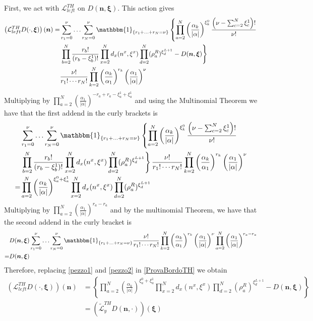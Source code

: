 \documentclass[10pt]{article}
\numberwithin{equation}{section}
\numberwithin{equation}{subsection}
\begin{document}
First, we act with $\mathcal{L}_{left}^{TH}$ on $D(\bm{n},\bm{\xi})$. This action gives
\begin{align}\label{ProvaBordoTH}
	\left(\mathcal{L}_{left}^{TH}D(\cdot,\bm{\xi})\right)(\bm{n})=\nonumber&\sum_{r_{1}=0}^{\nu}\ldots\sum_{r_{N}=0}^{\nu}\mathbbm{1}_{\{r_{1}+\ldots+r_{N}=\nu\}}\left\{\prod_{a=2}^{N}\left(\frac{\alpha_{k}}{|\alpha|}\right)^{\xi_{k}^{0}}\frac{\left(\nu-\sum_{c=2}^{N}\xi_{c}^{1}\right)!}{\nu!}\right.
	\\&\nonumber
	\left.\prod_{b=2}^{N}\frac{r_{b}!}{(r_{b}-\xi^{1}_{b})!}\prod_{x=2}^{N}d_{x}(n^{x},\xi^{x})\prod_{d=2}^{N}(\rho_{a}^{R})^{\xi_{d}^{L+1}}-D(\bm{n},\bm{\xi})\right\}
	\\&
	\frac{\nu!}{r_{1}!\cdots r_{N}!}\prod_{k=2}^{N}\left(\frac{\alpha_{k}}{\alpha_{1}}\right)^{r_{k}}\left(\frac{\alpha_{1}}{|\alpha|}\right)^{\nu}
\end{align}
Multiplying by $\prod_{a=2}^{N}\left(\frac{\alpha_{1}}{|\alpha|}\right)^{-r_{a}+r_{a}-\xi_{a}^{1}+\xi_{a}^{1}}$ and using the Multinomial Theorem we have that the first addend in the curly brackets is
\begin{align}\label{pezzo1}
	&\sum_{r_{1}=0}^{\nu}\ldots\sum_{r_{N}=0}^{\nu}\mathbbm{1}_{\{r_{1}+\ldots+r_{N}=\nu\}}\left\{\prod_{a=2}^{N}\left(\frac{\alpha_{k}}{|\alpha|}\right)^{\xi_{k}^{0}}\frac{\left(\nu-\sum_{c=2}^{N}\xi_{c}^{1}\right)!}{\nu!}\right.\nonumber
	\\&\nonumber
	\left.\prod_{b=2}^{N}\frac{r_{b}!}{(r_{b}-\xi^{1}_{b})!}\prod_{x=2}^{N}d_{x}(n^{x},\xi^{x})\prod_{d=2}^{N}(\rho_{a}^{R})^{\xi_{d}^{L+1}}\right\}	\frac{\nu!}{r_{1}!\cdots r_{N}!}\prod_{k=2}^{N}\left(\frac{\alpha_{k}}{\alpha_{1}}\right)^{r_{k}}\left(\frac{\alpha_{1}}{|\alpha|}\right)^{\nu}\\=&
	\prod_{a=2}^{N}\left(\frac{\alpha_{k}}{|\alpha|}\right)^{\xi_{a}^{0}+\xi_{a}^{1}}\prod_{x=2}^{N}d_{x}(n^{x},\xi^{x})\prod_{d=2}^{N}(\rho_{a}^{R})^{\xi_{d}^{L+1}}
\end{align}
Multiplying by $\prod_{a=2}^{N}\left(\frac{\alpha_{1}}{|\alpha|}\right)^{r_{a}-r_{a}}$ and by the multinomial Theorem, we have that the second addend in the curly bracket is
\begin{equation}\label{pezzo2}
	\begin{split}
	&D(\bm{n},\bm{\xi})\sum_{r_{1}=0}^{\nu}\ldots\sum_{r_{N}=0}^{\nu}\mathbbm{1}_{\{r_{1}+\ldots+r_{N}=\nu\}}\frac{\nu!}{r_{1}!\cdots r_{N}!}\prod_{k=2}^{N}\left(\frac{\alpha_{k}}{\alpha_{1}}\right)^{r_{k}}\left(\frac{\alpha_{1}}{|\alpha|}\right)^{\nu}\prod_{a=2}^{N}\left(\frac{\alpha_{1}}{|\alpha|}\right)^{r_{a}-r_{a}}\\=&D(\bm{n},\bm{\xi})
	\end{split}
\end{equation}
Therefore, replacing \eqref{pezzo1} and \eqref{pezzo2} in \eqref{ProvaBordoTH} we obtain 
\begin{align}
	\left(\mathcal{L}_{left}^{TH}D(\cdot,\bm{\xi})\right)(\bm{n})&=\left\{\prod_{a=2}^{N}\left(\frac{\alpha_{k}}{|\alpha|}\right)^{\xi_{a}^{0}+\xi_{a}^{1}}\prod_{x=2}^{N}d_{x}(n^{x},\xi^{x})\prod_{d=2}^{N}(\rho_{a}^{R})^{\xi_{d}^{L+1}}-D(\bm{n},\bm{\xi})\right\}
	\\&=
	\left(\widetilde{\mathcal{L}}_{y}^{TH}D(\bm{n},\cdot)\right)(\bm{\xi})
\end{align}
\end{document}
